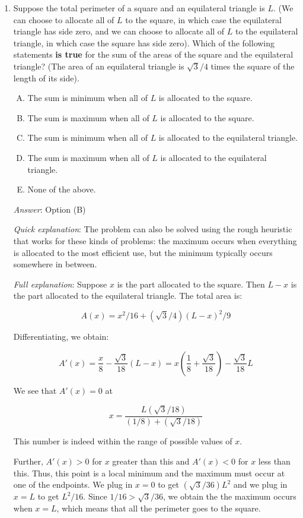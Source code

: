 \documentclass[10pt]{amsart}
\begin{document}
\begin{enumerate}
\item Suppose the total perimeter of a square and an equilateral
  triangle is $L$. (We can choose to allocate all of $L$ to the
  square, in which case the equilateral triangle has side zero, and we
  can choose to allocate all of $L$ to the equilateral triangle, in
  which case the square has side zero). Which of the following
  statements {\bf is true} for the sum of the areas of the square and
  the equilateral triangle? (The area of an equilateral triangle is
  $\sqrt{3}/4$ times the square of the length of its side).
  \begin{enumerate}[(A)]
  \item The sum is minimum when all of $L$ is allocated to the square.
  \item The sum is maximum when all of $L$ is allocated to the square.
  \item The sum is minimum when all of $L$ is allocated to the
    equilateral triangle.
  \item The sum is maximum when all of $L$ is allocated to the
    equilateral triangle.
  \item None of the above.
  \end{enumerate}

  {\em Answer}: Option (B)

  {\em Quick explanation}: The problem can also be solved
  using the rough heuristic that works for these kinds of problems:
  the maximum occurs when everything is allocated to the most
  efficient use, but the minimum typically occurs somewhere in
  between.

  {\em Full explanation}: Suppose $x$ is the part allocated to the
  square. Then $L - x$ is the part allocated to the equilateral
  triangle. The total area is:

  $$A(x) = x^2/16 + (\sqrt{3}/4)(L - x)^2/9$$

  Differentiating, we obtain:

  $$A'(x) = \frac{x}{8} - \frac{\sqrt{3}}{18} (L - x) = x \left(\frac{1}{8} + \frac{\sqrt{3}}{18} \right) - \frac{\sqrt{3}}{18}L$$

  We see that $A'(x) = 0$ at

  $$x = \frac{L(\sqrt{3}/18)}{(1/8) + (\sqrt{3}/18)}$$

  This number is indeed within the range of possible values of $x$.

  Further, $A'(x) > 0$ for $x$ greater than this and $A'(x) < 0$ for
  $x$ less than this. Thus, this point is a local minimum and the
  maximum must occur at one of the endpoints. We plug in $x = 0$ to
  get $(\sqrt{3}/36)L^2$ and we plug in $x = L$ to get $L^2/16$. Since
  $1/16 > \sqrt{3}/36$, we obtain the the maximum occurs when $x = L$,
  which means that all the perimeter goes to the square.


\end{enumerate}
\end{document}
